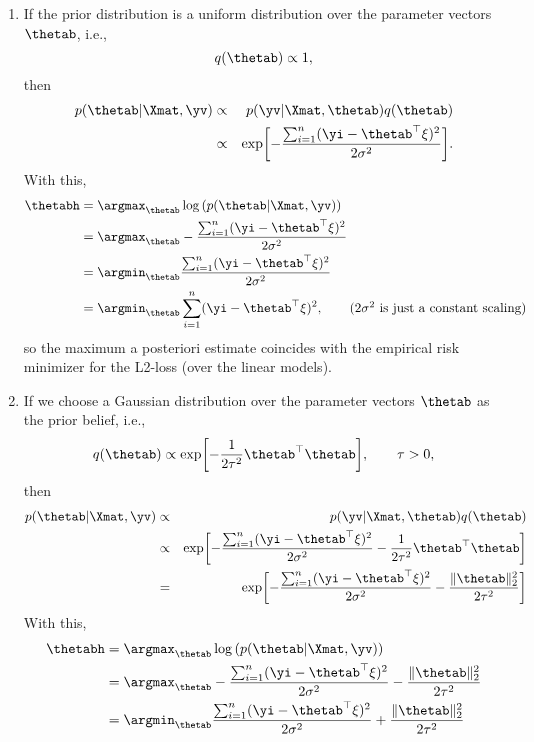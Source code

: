 \begin{enumerate}
%	
  \item  If the prior distribution is  a uniform distribution over the parameter vectors $\thetab$, i.e.,
%  
	$$  q(\thetab)  \propto 1, $$
%	
	then 
%	
	\begin{eqnarray*}
		p(\thetab | \Xmat, \yv) &\propto& p(\yv | \Xmat, \thetab) q(\thetab) \\
%		
		&\propto& \exp\biggl[-\frac{ \sum_{i=1}^n (\yi - \thetab^\top \xi)^2}{2\sigma^2}\biggr].
%		
	\end{eqnarray*}
%  
	With this, 
%	
	\begin{align*}
%				
		\thetabh 
%		
		&= \argmax_{\thetab} \log \left( p(\thetab | \Xmat, \yv) \right) \\
%		
		&= \argmax_{\thetab} -\frac{ \sum_{i=1}^n (\yi - \thetab^\top \xi)^2}{2\sigma^2} \\
%		
		&= \argmin_{\thetab}  \frac{ \sum_{i=1}^n (\yi - \thetab^\top \xi)^2}{2\sigma^2} \\
%		
		&= \argmin_{\thetab}  \sum_{i=1}^n (\yi - \thetab^\top \xi)^2, \tag{$2\sigma^2$ is just a constant scaling}
%		
	\end{align*}
%
	so the  maximum a posteriori estimate coincides with the empirical risk minimizer for the L2-loss (over the linear models).
%
  \item If we choose a Gaussian distribution over the parameter vectors $\thetab$ as the prior belief, i.e.,
  $$  q(\thetab)  \propto  \exp\biggl[ -\frac{1}{2\tau^2}\thetab^\top\thetab  \biggr], \qquad \tau>0, $$
  	then 
%  
  \begin{eqnarray*}
%  	
  	p(\thetab | \Xmat, \yv) &\propto& p(\yv | \Xmat, \thetab) q(\thetab) \\
  	&\propto& \exp\biggl[-\frac{ \sum_{i=1}^n (\yi - \thetab^\top \xi)^2}{2\sigma^2} -\frac{1}{2\tau^2}\thetab^\top\thetab \biggr] \\
%  	
	&=& \exp\biggl[-\frac{ \sum_{i=1}^n (\yi - \thetab^\top \xi)^2}{2\sigma^2} -\frac{\|\thetab\|_2^2}{2\tau^2}  \biggr]
  \end{eqnarray*}
  With this, 
  \begin{align*}
  	\thetabh 
  	&= \argmax_{\thetab} \log \left( p(\thetab | \Xmat, \yv) \right) \\
  	&= \argmax_{\thetab} -\frac{ \sum_{i=1}^n (\yi - \thetab^\top \xi)^2}{2\sigma^2} -\frac{\|\thetab\|_2^2}{2\tau^2}   \\
  	&= \argmin_{\thetab}  \frac{ \sum_{i=1}^n (\yi - \thetab^\top \xi)^2}{2\sigma^2} + \frac{\|\thetab\|_2^2}{2\tau^2}   \\

\end{align*}
\end{enumerate}
